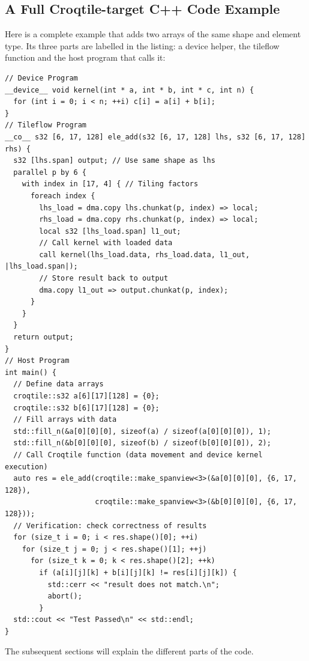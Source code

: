 \subsection*{A Full Croqtile-target C++ Code Example}

Here is a complete example that adds two arrays of the same shape and element type. Its three parts are labelled in the listing: a device helper, the tileflow function and the host program that calls it:

\begin{lstlisting}[language=croqtile,caption={A Full Croqtile-target C Code Example}]
// Device Program
__device__ void kernel(int * a, int * b, int * c, int n) {
  for (int i = 0; i < n; ++i) c[i] = a[i] + b[i];
}
// Tileflow Program
__co__ s32 [6, 17, 128] ele_add(s32 [6, 17, 128] lhs, s32 [6, 17, 128] rhs) {
  s32 [lhs.span] output; // Use same shape as lhs
  parallel p by 6 {
    with index in [17, 4] { // Tiling factors
      foreach index {
        lhs_load = dma.copy lhs.chunkat(p, index) => local;
        rhs_load = dma.copy rhs.chunkat(p, index) => local;
        local s32 [lhs_load.span] l1_out;
        // Call kernel with loaded data
        call kernel(lhs_load.data, rhs_load.data, l1_out, |lhs_load.span|);
        // Store result back to output
        dma.copy l1_out => output.chunkat(p, index);
      }
    }
  }
  return output;
}
// Host Program
int main() {
  // Define data arrays
  croqtile::s32 a[6][17][128] = {0};
  croqtile::s32 b[6][17][128] = {0};
  // Fill arrays with data
  std::fill_n(&a[0][0][0], sizeof(a) / sizeof(a[0][0][0]), 1);
  std::fill_n(&b[0][0][0], sizeof(b) / sizeof(b[0][0][0]), 2);
  // Call Croqtile function (data movement and device kernel execution)
  auto res = ele_add(croqtile::make_spanview<3>(&a[0][0][0], {6, 17, 128}),
                     croqtile::make_spanview<3>(&b[0][0][0], {6, 17, 128}));
  // Verification: check correctness of results
  for (size_t i = 0; i < res.shape()[0]; ++i)
    for (size_t j = 0; j < res.shape()[1]; ++j)
      for (size_t k = 0; k < res.shape()[2]; ++k)
        if (a[i][j][k] + b[i][j][k] != res[i][j][k]) {
          std::cerr << "result does not match.\n";
          abort();
        }
  std::cout << "Test Passed\n" << std::endl;
}
\end{lstlisting}

The subsequent sections will explain the different parts of the code.
